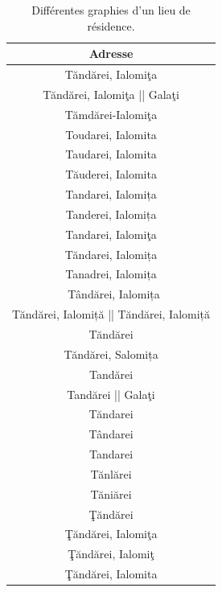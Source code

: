 \documentclass[a4paper,12pt,twoside]{book}
\begin{document}
                \begin{table}[ht]
                \centering
                \renewcommand\cellalign{cl}
                    \begin{tabular}{|c|}
                        \hline
                        Adresse\\\hline
                        Tăndărei, Ialomiţa\\
                        Tăndărei, Ialomiţa || Galaţi\\
                        Tămdărei-Ialomiţa\\
                        Toudarei, Ialomita\\
                        Taudarei, Ialomita\\
                        Tăuderei, Ialomita\\
                        Tandarei, Ialomița\\
                        Tanderei, Ialomița\\
                        Tandarei, Ialomiţa\\
                        Tăndarei, Ialomița\\
                        Tanadrei, Ialomița\\\
                        Tândărei, Ialomița\\
                        Tăndărei, Ialomiță || Tăndărei, Ialomiță\\
                        Tăndărei\\
                        Tăndărei, Salomița\\
                        Tandărei\\
                        Tandărei || Galaţi\\
                        Tăndarei\\
                        Tândarei\\
                        Tandarei\\
                        Tănlărei\\
                        Tăniărei\\
                        Ţăndărei\\
                        Ţăndărei, Ialomiţa\\
                        Ţăndărei, Ialomiţ\\
                        Ţăndărei, Ialomita\\\hline
                    \end{tabular}
                    \caption{Différentes graphies d'un lieu de résidence.}\label{tab9}
                \end{table}
                
\end{document}
